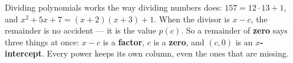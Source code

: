\documentclass[10pt]{article}
\begin{document}
\vspace{0.14in}

\begin{remindbox}
\small
Dividing polynomials works the way dividing numbers does: $157 = 12 \cdot 13 + 1$, and
$x^2 + 5x + 7 = (x + 2)(x + 3) + 1$. When the divisor is $x - c$, the remainder is no
accident --- it is the value $p(c)$. So a remainder of \textbf{zero} says three things at once:
$x - c$ is a \textbf{factor}, $c$ is a \textbf{zero}, and $(c, 0)$ is an \textbf{$x$-intercept}.
Every power keeps its own column, even the ones that are missing.
\end{remindbox}
\end{document}
